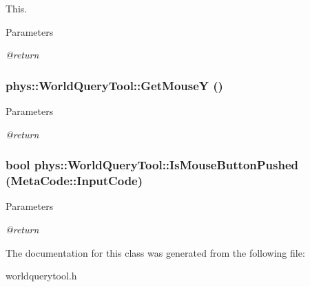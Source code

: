 This. 


\begin{DoxyParams}{Parameters}
\item[{\em @return}]\end{DoxyParams}
\hypertarget{classphys_1_1WorldQueryTool_ac2d8517db7305157c1393320f434751b}{
\subsubsection[{GetMouseY}]{ phys::WorldQueryTool::GetMouseY ()}}
\label{d8/d69/classphys_1_1WorldQueryTool_ac2d8517db7305157c1393320f434751b}

\begin{DoxyParams}{Parameters}
\item[{\em @return}]\end{DoxyParams}
\hypertarget{classphys_1_1WorldQueryTool_ae12be78aeb3b5a2caf05b9220909bc86}{
\subsubsection[{IsMouseButtonPushed}]{\setlength{\rightskip}{0pt plus 5cm}bool phys::WorldQueryTool::IsMouseButtonPushed ({\bf MetaCode::InputCode})}}
\label{d8/d69/classphys_1_1WorldQueryTool_ae12be78aeb3b5a2caf05b9220909bc86}

\begin{DoxyParams}{Parameters}
\item[{\em @return}]\end{DoxyParams}


The documentation for this class was generated from the following file:\begin{DoxyCompactItemize}
\item 
worldquerytool.h\end{DoxyCompactItemize}
